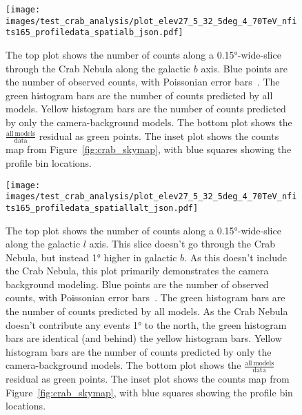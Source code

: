 \begin{figure}[p]
  \centering
  \texttt{[image: images/test\_crab\_analysis/plot\_elev27\_5\_32\_5deg\_4\_70TeV\_nfits165\_profiledata\_spatialb\_json.pdf]}
  \caption[Crab Nebula Profile along Galactic $b$]
  {
    The top plot shows the number of counts along a \ang{0.15}-wide-slice through the Crab Nebula along the galactic $b$ axis.
    Blue points are the number of observed counts, with Poissonian error bars~\cite{poissonfrequentistinterval}.
    The green histogram bars are the number of counts predicted by all models.
    Yellow histogram bars are the number of counts predicted by only the camera-background models.
    The bottom plot shows the $\frac{\mathrm{all\:models}}{\mathrm{data}}$ residual as green points.
    The inset plot shows the counts map from Figure~\ref{fig:crab_skymap}, with blue squares showing the profile bin locations.
  }
  \label{fig:crab_profile_b}
\end{figure}
    
\begin{figure}[p]
  \centering
  \texttt{[image: images/test\_crab\_analysis/plot\_elev27\_5\_32\_5deg\_4\_70TeV\_nfits165\_profiledata\_spatiallalt\_json.pdf]}
  \caption[Crab Nebula Profile along Galactic $l$ Off Source]
  {
    The top plot shows the number of counts along a \ang{0.15}-wide-slice along the galactic $l$ axis.
    This slice doesn't go through the Crab Nebula, but instead \ang{1} higher in galactic $b$.
    As this doesn't include the Crab Nebula, this plot primarily demonstrates the camera background modeling.
    Blue points are the number of observed counts, with Poissonian error bars~\cite{poissonfrequentistinterval}.
    The green histogram bars are the number of counts predicted by all models.
    As the Crab Nebula doesn't contribute any events \ang{1} to the north, the green histogram bars are identical (and behind) the yellow histogram bars.
    Yellow histogram bars are the number of counts predicted by only the camera-background models.
    The bottom plot shows the $\frac{\mathrm{all\:models}}{\mathrm{data}}$ residual as green points.
    The inset plot shows the counts map from Figure~\ref{fig:crab_skymap}, with blue squares showing the profile bin locations.
  }
  \label{fig:crab_profile_l_off}
\end{figure}

